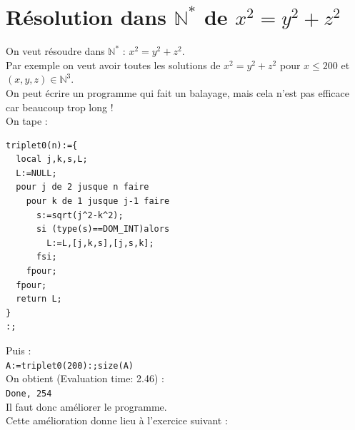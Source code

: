 \documentclass[a4paper,11pt]{book}
\newcommand{\N}{{\mathbb{N}}}
\begin{document}
\section{R\'esolution dans $\N^*$ de $x^2=y^2+z^2$}
On veut r\'esoudre dans $\N^*$ : $x^2=y^2+z^2$.\\
Par exemple on veut avoir toutes les solutions de $x^2=y^2+z^2$
pour  $x \leq 200$ et $(x,y,z)\in \N^3$.\\ 
On peut \'ecrire un programme qui fait un balayage, mais cela n'est pas 
efficace car beaucoup trop long !\\
On tape :
\begin{verbatim}
triplet0(n):={
  local j,k,s,L;
  L:=NULL;
  pour j de 2 jusque n faire
    pour k de 1 jusque j-1 faire
      s:=sqrt(j^2-k^2);
      si (type(s)==DOM_INT)alors
        L:=L,[j,k,s],[j,s,k];
      fsi; 
    fpour;
  fpour;
  return L;
}
:;
\end{verbatim}
Puis :\\
{\tt A:=triplet0(200):;size(A)}\\
On obtient (Evaluation time: 2.46) :\\
{\tt Done, 254}\\
Il faut donc am\'eliorer le programme.\\
 Cette am\'elioration donne lieu \`a l'exercice suivant :
\end{document}
